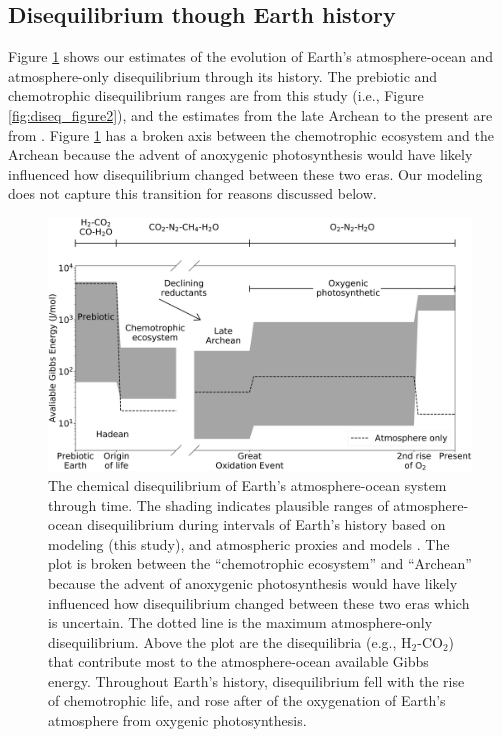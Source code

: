 \subsection{Disequilibrium though Earth history}

Figure \ref{fig:diseq_figure3} shows our estimates of the evolution of Earth's atmosphere-ocean and atmosphere-only disequilibrium through its history. The prebiotic and chemotrophic disequilibrium ranges are from this study (i.e., Figure \ref{fig:diseq_figure2}), and the estimates from the late Archean to the present are from \citet{KrissansenTotton_2018c}. Figure \ref{fig:diseq_figure3} has a broken axis between the chemotrophic ecosystem and the Archean because the advent of anoxygenic photosynthesis would have likely influenced how disequilibrium changed between these two eras. Our modeling does not capture this transition for reasons discussed below.

\begin{figure}
  \centering
  \includegraphics[width=1.0\textwidth]{tex/2diseq/Figure3.pdf}
  \caption{The chemical disequilibrium of Earth's atmosphere-ocean system through time. The shading indicates plausible ranges of atmosphere-ocean disequilibrium during intervals of Earth's history based on modeling (this study), and atmospheric proxies and models \citep{KrissansenTotton_2018c}. The plot is broken between the ``chemotrophic ecosystem'' and ``Archean'' because the advent of anoxygenic photosynthesis would have likely influenced how disequilibrium changed between these two eras which is uncertain. The dotted line is the maximum atmosphere-only disequilibrium. Above the plot are the disequilibria (e.g., H$_2$-CO$_2$) that contribute most to the atmosphere-ocean available Gibbs energy. Throughout Earth's history, disequilibrium fell with the rise of chemotrophic life, and rose after of the oxygenation of Earth's atmosphere from oxygenic photosynthesis.}
  \label{fig:diseq_figure3}
\end{figure}

